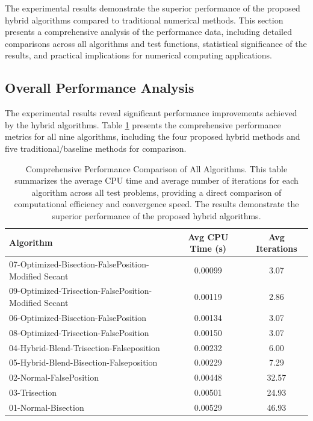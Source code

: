 \documentclass[amsmath, amssymb, aps]{revtex4-2}
\begin{document}
The experimental results demonstrate the superior performance of the proposed hybrid algorithms compared to traditional numerical methods. This section presents a comprehensive analysis of the performance data, including detailed comparisons across all algorithms and test functions, statistical significance of the results, and practical implications for numerical computing applications.

\subsection{Overall Performance Analysis}

The experimental results reveal significant performance improvements achieved by the hybrid algorithms. Table \ref{tab:performance_comparison} presents the comprehensive performance metrics for all nine algorithms, including the four proposed hybrid methods and five traditional/baseline methods for comparison.

\begin{table}[H]
\centering
\caption{Comprehensive Performance Comparison of All Algorithms. This table summarizes the average CPU time and average number of iterations for each algorithm across all test problems, providing a direct comparison of computational efficiency and convergence speed. The results demonstrate the superior performance of the proposed hybrid algorithms.}
\label{tab:performance_comparison}
\begin{tabular}{lcc}
\toprule
Algorithm & Avg CPU Time (s) & Avg Iterations \\
\midrule
07-Optimized-Bisection-FalsePosition-Modified Secant & 0.00099 & 3.07 \\
09-Optimized-Trisection-FalsePosition-Modified Secant & 0.00119 & 2.86 \\
06-Optimized-Bisection-FalsePosition & 0.00134 & 3.07 \\
08-Optimized-Trisection-FalsePosition & 0.00150 & 3.07 \\
04-Hybrid-Blend-Trisection-Falseposition & 0.00232 & 6.00 \\
05-Hybrid-Blend-Bisection-Falseposition & 0.00229 & 7.29 \\
02-Normal-FalsePosition & 0.00448 & 32.57 \\
03-Trisection & 0.00501 & 24.93 \\
01-Normal-Bisection & 0.00529 & 46.93 \\
\bottomrule
\end{tabular}
\end{table}
\end{document}

